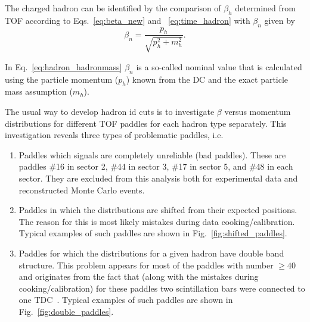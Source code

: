 The charged hadron can be identified by the comparison of $\beta_{h}$ determined from TOF according to Eqs.~\eqref{eq:beta_new} and ~\eqref{eq:time_hadron} with $\beta_{n}$ given by 
\begin{equation}
\beta_{n}=\frac{p_{h}}{\sqrt{p_{h}^{2}+m_{h}^{2}}}.
\label{eq:hadron_hadronmass}
\end{equation}

In Eq.~\eqref{eq:hadron_hadronmass} $\beta_{n}$ is a so-called nominal value that is calculated using the particle momentum ($p_{h}$) known from the DC and the exact particle mass assumption ($m_{h}$).

The usual way to develop hadron id cuts is to investigate $\beta$ versus momentum distributions for different TOF paddles for each hadron type separately. This investigation reveals three types of problematic paddles, i.e.

\begin{enumerate}[label=\Alph*]\vspace{-0.5em}
\item  Paddles which signals are completely unreliable (bad paddles). These are paddles \#16 in sector 2, \#44 in sector 3, \#17 in sector 5, and \#48 in each sector. They are excluded from this analysis both for experimental data and reconstructed Monte Carlo events. 
\item Paddles in which the distributions are shifted from their expected positions. The reason for this is most likely mistakes during data cooking/calibration. Typical examples of such paddles are shown in Fig.~\ref{fig:shifted_paddles}.
\item Paddles for which the distributions for a given hadron have double band structure. This problem appears for most of the paddles with number $\geq 40$ and originates from the fact that (along with the mistakes during cooking/calibration) for these paddles two scintillation bars were connected to one TDC~\cite{clas_tof_paddles}. Typical examples of such paddles are shown in Fig.~\ref{fig:double_paddles}.
\end{enumerate}

